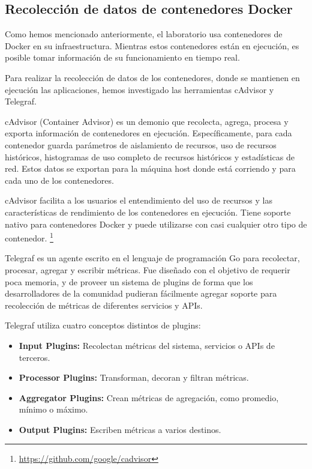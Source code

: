 \subsection{Recolección de datos de contenedores Docker}
\label{contenedores}

Como hemos mencionado anteriormente, el laboratorio usa contenedores de Docker
en su infraestructura. Mientras estos contenedores están en ejecución, es
posible tomar información de su funcionamiento en tiempo real.

Para realizar la recolección de datos de los contenedores, donde se mantienen
en ejecución las aplicaciones, hemos investigado las herramientas cAdvisor y
Telegraf. 

cAdvisor (Container Advisor) es un demonio que recolecta, agrega, procesa y
exporta información de contenedores en ejecución. Específicamente, para cada
contenedor guarda parámetros de aislamiento de recursos, uso de recursos
históricos, histogramas de uso completo de recursos históricos y estadísticas
de red. Estos datos se exportan para la máquina host donde está corriendo y
para cada uno de los contenedores.

cAdvisor facilita a los usuarios el entendimiento del uso de recursos y las
características de rendimiento de los contenedores en ejecución. Tiene soporte
nativo para contenedores Docker y puede utilizarse con casi cualquier otro tipo
de contenedor. \footnote{\url{https://github.com/google/cadvisor}}

Telegraf es un agente escrito en el lenguaje de programación Go para
recolectar, procesar, agregar y escribir métricas. Fue diseñado con el objetivo
de requerir poca memoria, y de proveer un sistema de plugins de forma que los
desarrolladores de la comunidad pudieran fácilmente agregar soporte para
recolección de métricas de diferentes servicios y APIs.

Telegraf utiliza cuatro conceptos distintos de plugins:

\begin{itemize}

  \item \textbf{Input Plugins:}
  Recolectan métricas del sistema, servicios o APIs de terceros.

  \item \textbf{Processor Plugins:}
  Transforman, decoran y filtran métricas.

  \item \textbf{Aggregator Plugins:}
  Crean métricas de agregación, como promedio, mínimo o máximo.

  \item \textbf{Output Plugins:}
  Escriben métricas a varios destinos.

\end{itemize}

